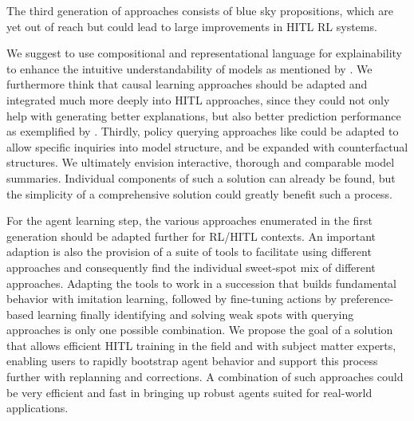\documentclass[twoside,11pt]{article}
\begin{document}

The third generation of approaches consists of blue sky propositions, which are yet out of reach but could lead to large improvements in HITL RL systems.


We suggest to use compositional and representational language for explainability to enhance the intuitive understandability of models as mentioned by \citet{RoyEtAl:2021:RLRoboticsChallenges}. We furthermore think that causal learning approaches should be adapted and integrated much more deeply into HITL approaches, since they could not only help with generating better explanations, but also better prediction performance as exemplified by \citet{MadumalEtAl:2020:CausalRLCFs}. Thirdly, policy querying approaches like \citet{HayesShah:2017:AutonomousPolicyExplanation} could be adapted to allow specific inquiries into model structure, and be expanded with counterfactual structures.
We ultimately envision interactive, thorough and comparable model summaries. Individual components of such a solution can already be found, but the simplicity of a comprehensive solution could greatly benefit such a process.



For the agent learning step, the various approaches enumerated in the first generation should be adapted further for RL/HITL contexts. An important adaption is also the provision of a suite of tools to facilitate using different approaches and consequently find the individual sweet-spot mix of different approaches. Adapting the tools to work in a succession that builds fundamental behavior with imitation learning, followed by fine-tuning actions by preference-based learning finally identifying and solving weak spots with querying approaches is only one possible combination.
We propose the goal of a solution that allows efficient HITL training in the field and with subject matter experts, enabling users to rapidly bootstrap agent behavior and support this process further with replanning and corrections. A combination of such approaches could be very efficient and fast in bringing up robust agents suited for real-world applications.

\end{document}
